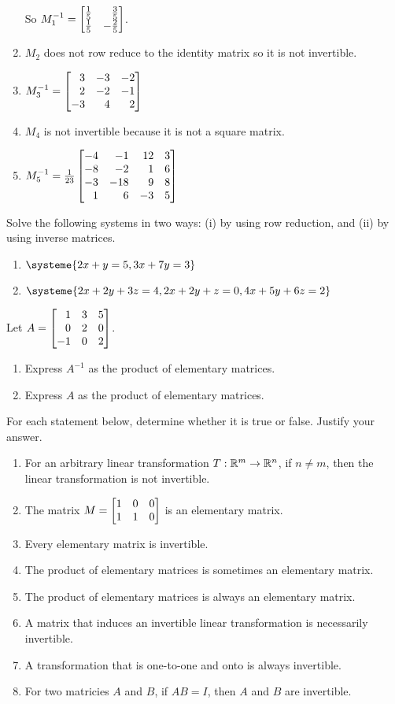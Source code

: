 \begin{exercises}
\begin{problist}
\begin{solution}
\begin{enumerate}
				So $M_{1}^{-1}=\mat{\frac{1}{5}&\frac{3}{5}\\
								 \frac{1}{5}&-\frac{2}{5}\\}$.
				\item $M_{2}$ does not row reduce to the identity matrix so it is not invertible.
				\item $M_{3}^{-1}=\mat{3&-3&-2\\2&-2&-1\\-3&4&2}$
				\item $M_{4}$ is not invertible because it is not a square matrix.
				\item $M_{5}^{-1}=\frac{1}{23}\mat{-4&-1&12&3\\-8&-2&1&6\\-3&-18&9&8\\1&6&-3&5}$
			\end{enumerate}
		\end{solution}

		\prob Solve the following systems in two ways: (i) by using row reduction,
		and (ii) by using inverse matrices.
		\begin{enumerate}
			\item $\systeme{2x+y=5,3x+7y=3}$

			\item $\systeme{2x+2y+3z=4,2x+2y+z=0, 4x+5y+6z=2}$
		\end{enumerate}

		\prob Let $A=\mat{1&3&5\\0&2&0\\-1&0&2}$.
		\begin{enumerate}
			\item Express $A^{-1}$ as the product of elementary matrices.

			\item Express $A$ as the product of elementary matrices.
		\end{enumerate}

		\prob For each statement below, determine whether it is true or false. Justify your answer.
		\begin{enumerate}
			\item For an arbitrary linear transformation $T:\mathbb{R}^{m}\to\mathbb{R}^{n}$,
				if $n \neq m$, then the linear transformation is
				not invertible.
			\item The matrix $M = \mat{1&0&0\\1&1&0}$ is an elementary
				matrix.
			\item Every elementary matrix is invertible.
			\item The product of elementary matrices is sometimes an elementary matrix.
			\item The product of elementary matrices is always an elementary matrix.
			\item A matrix that induces an invertible linear transformation is necessarily invertible.
			\item A transformation that is one-to-one and onto is always invertible.
			\item For two matricies $A$ and $B$, if $AB=I$, then $A$ and $B$ are invertible.
		\end{enumerate}


\end{problist}
\end{exercises}
